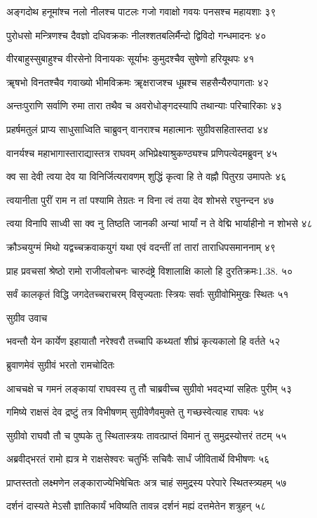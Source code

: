 अङ्गदोथ हनूमांश्च नलो नीलश्च पाटलः
गजो गवाक्षो गवयः पनसश्च महायशाः ३९

पुरोधसो मन्त्रिणश्च दैवज्ञो दधिवक्रकः
नीलश्शतबलिर्मैन्दो द्विविदो गन्धमादनः ४०

वीरबाहुस्सुबाहुश्च वीरसेनो विनायकः
सूर्याभः कुमुदश्चैव सुषेणो हरियूथपः ४१

ॠषभो विनतश्चैव गवाख्यो भीमविक्रमः
ॠक्षराजश्च धूम्रश्च सहसैन्यैरुपागताः ४२

अन्तःपुराणि सर्वाणि रुमा तारा तथैव च
अवरोधोङ्गदस्यापि तथान्याः परिचारिकाः ४३

प्रहर्षमतुलं प्राप्य साधुसाध्विति चाब्रुवन्
वानराश्च महात्मानः सुग्रीवसहितास्तदा ४४

वानर्यश्च महाभागास्ताराद्यास्तत्र राघवम्
अभिप्रेक्ष्याश्रुकण्ठ्यश्च प्रणिपत्येदमब्रुवन् ४५

क्व सा देवी त्वया देव या विनिर्जित्यरावणम्
शुद्धिं कृत्वा हि ते वह्नौ पितुरग्र उमापतेः ४६

त्वयानीता पुरीं राम न तां पश्यामि तेग्रतः
न विना त्वं तया देव शोभसे रघुनन्दन ४७

त्वया विनापि साध्वी सा क्व नु तिष्ठति जानकी
अन्यां भार्यां न ते वेद्मि भार्याहीनो न शोभसे ४८

क्रौञ्चयुग्मं मिथो यद्वच्चक्रवाकयुगं यथा
एवं वदन्तीं तां तारां ताराधिपसमाननाम् ४९

प्राह प्रवचसां श्रेष्ठो रामो राजीवलोचनः
चारुदंष्ट्रे विशालाक्षि कालो हि दुरतिक्रमः1.38. ५०

सर्वं कालकृतं विद्धि जगदेतच्चराचरम्
विसृज्यताः स्त्रियः सर्वाः सुग्रीवोभिमुखः स्थितः ५१

सुग्रीव उवाच

भवन्तौ येन कार्येण इहायातौ नरेश्वरौ
तच्चापि कथ्यतां शीघ्रं कृत्यकालो हि वर्तते ५२

ब्रुवाणमेवं सुग्रीवं भरतो रामचोदितः

आचचक्षे च गमनं लङ्कायां राघवस्य तु
तौ चाब्रवीच्च सुग्रीवो भवद्भ्यां सहितः पुरीम् ५३

गमिष्ये राक्षसं देव द्रष्टुं तत्र विभीषणम्
सुग्रीवेणैवमुक्ते तु गच्छस्वेत्याह राघवः ५४

सुग्रीवो राघवौ तौ च पुष्पके तु स्थितास्त्रयः
तावत्प्राप्तं विमानं तु समुद्रस्योत्तरं तटम् ५५

अब्रवीद्भरतं रामो ह्यत्र मे राक्षसेश्वरः
चतुर्भिः सचिवैः सार्धं जीवितार्थे विभीषणः ५६

प्राप्तस्ततो लक्ष्मणेन लङ्काराज्येभिषेचितः
अत्र चाहं समुद्रस्य परेपारे स्थितस्त्र्यहम् ५७

दर्शनं दास्यते मेऽसौ ज्ञातिकार्यं भविष्यति
तावन्न दर्शनं मह्यं दत्तमेतेन शत्रुहन् ५८

